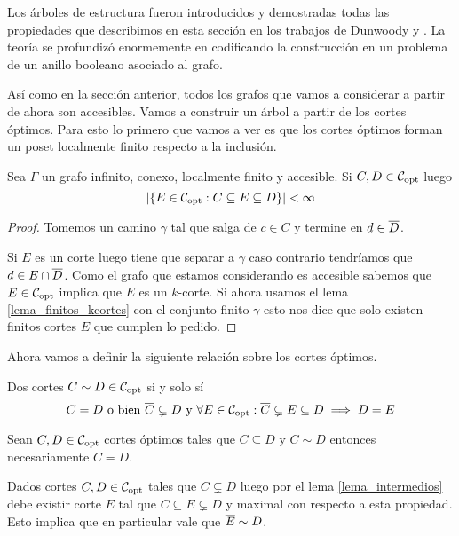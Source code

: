 \documentclass[tesis.tex]{subfiles}
\begin{document}
Los árboles de estructura fueron introducidos y demostradas todas las propiedades que describimos en esta sección en los trabajos de Dunwoody \cite{dunwoody1979accessibility} y \cite{dunwoody1982cutting}.
La teoría se profundizó enormemente en \cite{dicks1989groups} codificando la construcción en un problema de un anillo booleano asociado al grafo. 

Así como en la sección anterior, todos los grafos que vamos a considerar a partir de ahora son accesibles.
Vamos a construir un árbol a partir de los cortes óptimos.
Para esto lo primero que vamos a ver es que los cortes óptimos forman un poset localmente finito respecto a la inclusión.

\begin{lema}\label{lema_intermedios}
	Sea $\Gamma$ un grafo infinito, conexo, localmente finito y accesible.
	Si $C,D \in {\cal C}_{\text{opt}}$ luego 
	\[
	|\{ E \in {\cal C}_{\text{opt}} : C \subseteq E \subseteq D \}| < \infty
	\]
\end{lema}
\begin{proof}
	Tomemos un camino $\gamma$ tal que salga de $c \in C$ y termine en $d \in \overline D$.
	
	Si $E$ es un corte luego tiene que separar a $\gamma$ caso contrario tendríamos que $d \in E \cap \overline D$.
	Como el grafo que estamos considerando es accesible sabemos que $E \in {\cal C}_{\text{opt}}$ implica que $E$ es un $k$-corte.
	Si ahora usamos el lema \ref{lema_finitos_kcortes} con el conjunto finito $\gamma$ esto nos dice que solo existen finitos cortes $E$ que cumplen lo pedido.
\end{proof}


Ahora vamos a definir la siguiente relación sobre los cortes óptimos.

\begin{deff}
	Dos cortes $C \sim D \in {\cal C}_{\text{opt}}$ si y solo sí
	\[
		C = D \ \text{o bien} \ \overline C \subsetneq D \ \text{y} \ \forall E \in {\cal C}_{\text{opt}} : \overline C \subsetneq E \subseteq D \implies D = E
	\]
\end{deff}

\begin{obs}\label{obs_copt_igualdad}
	Sean $C,D \in {\cal C}_{\text{opt}}$ cortes óptimos tales que $C \subseteq D$ y $C \sim D$ entonces necesariamente $C = D$.
\end{obs}

\begin{obs}\label{obs_cortes_maximal}
	Dados cortes $C,D \in {\cal C}_{\text{opt}}$ tales que $C \subsetneq D$ luego por el lema \ref{lema_intermedios} debe existir corte $E$ tal que $C \subseteq E \subsetneq D$ y maximal con respecto a esta propiedad. 
	Esto implica que en particular vale que $\overline E \sim D$.
\end{obs}
\end{document}
